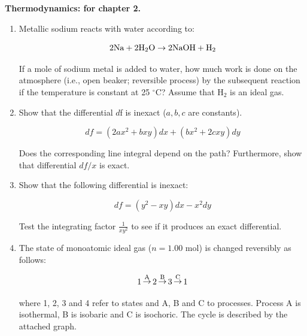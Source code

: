\noindent
\textbf{Thermodynamics:
 for chapter 2.}\\

\begin{enumerate}

\item Metallic sodium reacts with water according to:

$$2\textnormal{Na} + 2\textnormal{H}_2\textnormal{O} \rightarrow 2\textnormal{NaOH} + \textnormal{H}_2$$

If a mole of sodium metal is added to water, how much work is done on the atmosphere (i.e., open beaker; reversible process) by the subsequent reaction if the temperature is constant at 25 $^\circ$C? Assume that H$_2$ is an ideal gas.


\item Show that the differential $d$f is inexact ($a,b,c$ are constants).

$$df = \left(2ax^2 + bxy\right)dx + \left(bx^2 + 2cxy\right)dy$$

Does the corresponding line integral depend on the path? Furthermore, show that differential $df / x$ is exact.


\item Show that the following differential is inexact:

$$df = \left(y^2 - xy\right)dx - x^2dy$$

Test the integrating factor $\frac{1}{xy^2}$ to see if it produces an exact differential.


\item The state of monoatomic ideal gas ($n = 1.00$ mol) is changed reversibly as follows:

$$1 \mathop\rightarrow\limits^{\textnormal{A}} 2 \mathop\rightarrow\limits^{\textnormal{B}} 3 \mathop\rightarrow\limits^{\textnormal{C}} 1$$

where 1, 2, 3 and 4 refer to states and A, B and C to processes. Process A is isothermal, B is isobaric and C is isochoric. The cycle is described by the attached graph.


\end{enumerate}
